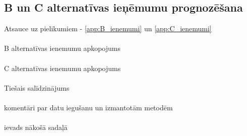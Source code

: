 \subsection{B un C alternatīvas ieņēmumu prognozēšana}
Atsauce uz pielikumiem - \ref{app:B_ienemumi} un \ref{app:C_ienemumi}
\paragraph{}
B alternatīvas ienemumu apkopojums
\paragraph{}
C alternatīvas ienemumu apkopojums
\paragraph{}
Tiešais salīdzinājums
\paragraph{}
komentāri par datu iegušanu un izmantotām metodēm
\paragraph{}
ievads nākošā sadaļā
